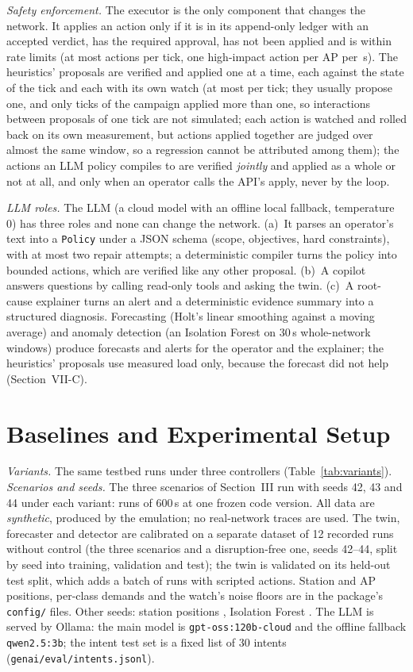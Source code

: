 \documentclass[conference]{IEEEtran}
\begin{document}
\emph{Safety enforcement.} The executor is the only component that changes the network. It applies an action only if it is in its append-only ledger with an accepted verdict, has the required approval, has not been applied and is within rate limits (at most \CfgMaxActions{} actions per tick, one high-impact action per AP per \CfgHighImpactGap\,s). The heuristics' proposals are verified and applied one at a time, each against the state of the tick and each with its own watch (at most \CfgMaxActions{} per tick; they usually propose one, and only \TickMulti{} ticks of the campaign applied more than one, so interactions between proposals of one tick are not simulated; each action is watched and rolled back on its own measurement, but actions applied together are judged over almost the same window, so a regression cannot be attributed among them); the actions an LLM policy compiles to are verified \emph{jointly} and applied as a whole or not at all, and only when an operator calls the API's apply, never by the loop.

\emph{LLM roles.} The LLM (a cloud model with an offline local fallback, temperature 0) has three roles and none can change the network. (a)~It parses an operator's text into a \texttt{Policy} under a JSON schema (scope, objectives, hard constraints), with at most two repair attempts; a deterministic compiler turns the policy into bounded actions, which are verified like any other proposal. (b)~A copilot answers questions by calling read-only tools and asking the twin. (c)~A root-cause explainer turns an alert and a deterministic evidence summary into a structured diagnosis. Forecasting (Holt's linear smoothing \cite{holt2004} against a moving average) and anomaly detection (an Isolation Forest \cite{liu2008} on 30\,s whole-network windows) produce forecasts and alerts for the operator and the explainer; the heuristics' proposals use measured load only, because the forecast did not help (Section~VII-C).

\section{Baselines and Experimental Setup}
\emph{Variants.} The same testbed runs under three controllers (Table~\ref{tab:variants}). \emph{Scenarios and seeds.} The three scenarios of Section~III run with seeds 42, 43 and 44 under each variant: \NumRuns{} runs of 600\,s at one frozen code version. All data are \emph{synthetic}, produced by the emulation; no real-network traces are used. The twin, forecaster and detector are calibrated on a separate dataset of 12 recorded runs without control (the three scenarios and a disruption-free one, seeds 42--44, split by seed into training, validation and test); the twin is validated on its held-out test split, which adds a batch of runs with scripted actions. Station and AP positions, per-class demands and the watch's noise floors are in the package's \texttt{config/} files. Other seeds: station positions \CfgStationSeed, Isolation Forest \CfgForestSeed. The LLM is served by Ollama: the main model is \texttt{gpt-oss:120b-cloud} and the offline fallback \texttt{qwen2.5:3b}; the intent test set is a fixed list of 30 intents (\texttt{genai/eval/intents.jsonl}).
\end{document}
